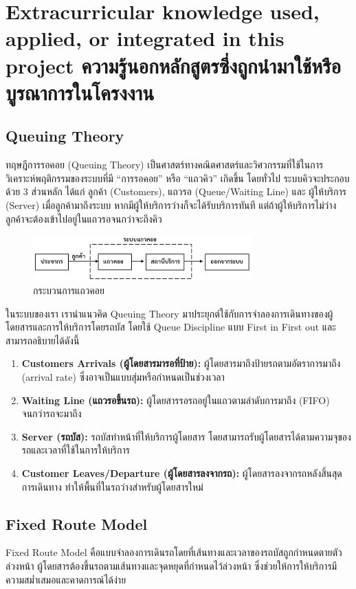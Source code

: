\section{\ifenglish%
Extracurricular knowledge used, applied, or integrated in this project
\else%
ความรู้นอกหลักสูตรซึ่งถูกนำมาใช้หรือบูรณาการในโครงงาน
\fi
}

\subsection{Queuing Theory}
ทฤษฎีการรอคอย (Queuing Theory) เป็นศาสตร์ทางคณิตศาสตร์และวิศวกรรมที่ใช้ในการวิเคราะห์พฤติกรรมของระบบที่มี 
“การรอคอย” หรือ “แถวคิว” เกิดขึ้น โดยทั่วไป ระบบคิวจะประกอบด้วย 3 ส่วนหลัก ได้แก่ ลูกค้า (Customers), 
แถวรอ (Queue/Waiting Line) และ ผู้ให้บริการ (Server) เมื่อลูกค้ามาถึงระบบ หากมีผู้ให้บริการว่างก็จะได้รับบริการทันที 
แต่ถ้าผู้ให้บริการไม่ว่าง ลูกค้าจะต้องเข้าไปอยู่ในแถวรอจนกว่าจะถึงคิว

\begin{figure}[h]
    \centering
    \includegraphics[width=0.75\textwidth]{Query_theory.png}
    \caption{กระบวนการแถวคอย}
    \label{fig:example}
\end{figure}
\indent ในระบบของเรา เรานำแนวคิด Queuing Theory มาประยุกต์ใช้กับการจำลองการเดินทางของผู้โดยสารและการให้บริการโดยรถบัส โดยใช้ Queue Discipline แบบ First in First out และสามารถอธิบายได้ดังนี้
\begin{enumerate}
    \item \textbf{Customers Arrivals (ผู้โดยสารมารอที่ป้าย):} ผู้โดยสารมาถึงป้ายรถตามอัตราการมาถึง (arrival rate) ซึ่งอาจเป็นแบบสุ่มหรือกำหนดเป็นช่วงเวลา
    \item \textbf{Waiting Line (แถวรอขึ้นรถ):} ผู้โดยสารรอรถอยู่ในแถวตามลำดับการมาถึง (FIFO) จนกว่ารถจะมาถึง
    \item \textbf{Server (รถบัส):} รถบัสทำหน้าที่ให้บริการผู้โดยสาร โดยสามารถรับผู้โดยสารได้ตามความจุของรถและเวลาที่ใช้ในการให้บริการ
    \item \textbf{Customer Leaves/Departure (ผู้โดยสารลงจากรถ):} ผู้โดยสารลงจากรถหลังสิ้นสุดการเดินทาง ทำให้พื้นที่ในรถว่างสำหรับผู้โดยสารใหม่
\end{enumerate}

\subsection{Fixed Route Model}
Fixed Route Model คือแบบจำลองการเดินรถโดยที่เส้นทางและเวลาของรถบัสถูกกำหนดตายตัวล่วงหน้า ผู้โดยสารต้องขึ้นรถตามเส้นทางและจุดหยุดที่กำหนดไว้ล่วงหน้า ซึ่งช่วยให้การให้บริการมีความสม่ำเสมอและคาดการณ์ได้ง่าย


